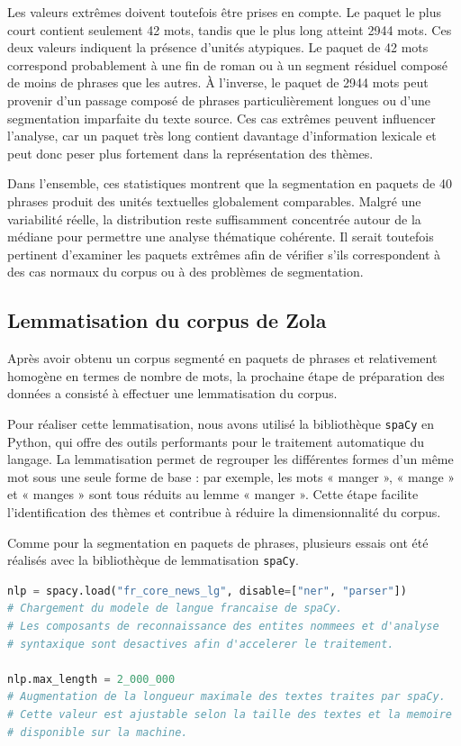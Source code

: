 \documentclass{article}
\begin{document}
Les valeurs extrêmes doivent toutefois être prises en compte. Le paquet le plus court contient seulement 42 mots, tandis que le plus long atteint 2944 mots. Ces deux valeurs indiquent la présence d'unités atypiques. Le paquet de 42 mots correspond probablement à une fin de roman ou à un segment résiduel composé de moins de phrases que les autres. À l'inverse, le paquet de 2944 mots peut provenir d'un passage composé de phrases particulièrement longues ou d'une segmentation imparfaite du texte source. Ces cas extrêmes peuvent influencer l'analyse, car un paquet très long contient davantage d'information lexicale et peut donc peser plus fortement dans la représentation des thèmes.

Dans l'ensemble, ces statistiques montrent que la segmentation en paquets de 40 phrases produit des unités textuelles globalement comparables. Malgré une variabilité réelle, la distribution reste suffisamment concentrée autour de la médiane pour permettre une analyse thématique cohérente. Il serait toutefois pertinent d'examiner les paquets extrêmes afin de vérifier s'ils correspondent à des cas normaux du corpus ou à des problèmes de segmentation.


\subsection{Lemmatisation du corpus de Zola}

Après avoir obtenu un corpus segmenté en paquets de phrases et relativement homogène en termes de nombre de mots, la prochaine étape de préparation des données a consisté à effectuer une lemmatisation du corpus.

Pour réaliser cette lemmatisation, nous avons utilisé la bibliothèque \texttt{spaCy} en Python, qui offre des outils performants pour le traitement automatique du langage. La lemmatisation permet de regrouper les différentes formes d'un même mot sous une seule forme de base : par exemple, les mots « manger », « mange » et « manges » sont tous réduits au lemme « manger ». Cette étape facilite l'identification des thèmes et contribue à réduire la dimensionnalité du corpus.

Comme pour la segmentation en paquets de phrases, plusieurs essais ont été réalisés avec la bibliothèque de lemmatisation \texttt{spaCy}.

\begin{lstlisting}[language=Python, caption={Importation du modèle français de spaCy}]
nlp = spacy.load("fr_core_news_lg", disable=["ner", "parser"])
# Chargement du modele de langue francaise de spaCy.
# Les composants de reconnaissance des entites nommees et d'analyse
# syntaxique sont desactives afin d'accelerer le traitement.

nlp.max_length = 2_000_000
# Augmentation de la longueur maximale des textes traites par spaCy.
# Cette valeur est ajustable selon la taille des textes et la memoire
# disponible sur la machine.
\end{lstlisting}
\end{document}
